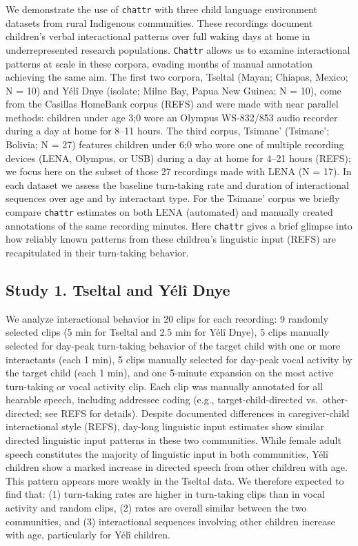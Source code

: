 \documentclass[10pt, letterpaper]{article}
\begin{document}
We demonstrate the use of \texttt{chattr} with three child language
environment datasets from rural Indigenous communities. These recordings
document children's verbal interactional patterns over full waking days
at home in underrepresented research populations. \texttt{Chattr} allows
us to examine interactional patterns at scale in these corpora, evading
months of manual annotation achieving the same aim. The first two
corpora, Tseltal (Mayan; Chiapas, Mexico; N = 10) and Yélî Dnye
(isolate; Milne Bay, Papua New Guinea; N = 10), come from the Casillas
HomeBank corpus (REFS) and were made with near parallel methods:
children under age 3;0 wore an Olympus WS-832/853 audio recorder during
a day at home for 8--11 hours. The third corpus, Tsimane' (Tsimane';
Bolivia; N = 27) features children under 6;0 who wore one of multiple
recording devices (LENA, Olympus, or USB) during a day at home for 4--21
hours (REFS); we focus here on the subset of those 27 recordings made
with LENA (N = 17). In each dataset we assess the baseline turn-taking
rate and duration of interactional sequences over age and by interactant
type. For the Tsimane' corpus we briefly compare \texttt{chattr}
estimates on both LENA (automated) and manually created annotations of
the same recording minutes. Here \texttt{chattr} gives a brief glimpse
into how reliably known patterns from these children's linguistic input
(REFS) are recapitulated in their turn-taking behavior.

\hypertarget{study-1.-tseltal-and-yuxe9luxee-dnye}{%
\subsection{Study 1. Tseltal and Yélî
Dnye}\label{study-1.-tseltal-and-yuxe9luxee-dnye}}

We analyze interactional behavior in 20 clips for each recording: 9
randomly selected clips (5 min for Tseltal and 2.5 min for Yélî Dnye), 5
clips manually selected for day-peak turn-taking behavior of the target
child with one or more interactants (each 1 min), 5 clips manually
selected for day-peak vocal activity by the target child (each 1 min),
and one 5-minute expansion on the most active turn-taking or vocal
activity clip. Each clip was manually annotated for all hearable speech,
including addressee coding (e.g., target-child-directed
vs.~other-directed; see REFS for details). Despite documented
differences in caregiver-child interactional style (REFS), day-long
linguistic input estimates show similar directed linguistic input
patterns in these two communities. While female adult speech constitutes
the majority of linguistic input in both communities, Yélî children show
a marked increase in directed speech from other children with age. This
pattern appears more weakly in the Tseltal data. We therefore expected
to find that: (1) turn-taking rates are higher in turn-taking clips than
in vocal activity and random clips, (2) rates are overall similar
between the two communities, and (3) interactional sequences involving
other children increase with age, particularly for Yélî children.
\end{document}
